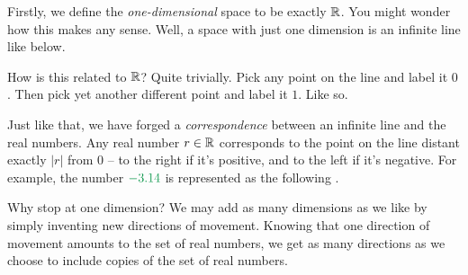 Firstly, we define the \emph{one-dimensional} space to be exactly $\mathbb{R}$. You
might wonder how this makes any sense. Well, a space with just one dimension is
an infinite line like below.
\begin{center}
\end{center}
How is this related to $\mathbb{R}$? Quite trivially. Pick any point on the line and
label it $0$. Then pick yet another different point and label it $1$. Like so.
\begin{center}
\end{center}
Just like that, we have forged a \emph{correspondence} between an infinite line
and the real numbers. Any real number $r \in \mathbb{R}$ corresponds to the point on the
line distant exactly $|r|$ from $0$ -- to the right if it's positive, and to the
left if it's negative. For example, the number $\clg{-3.14}$ is represented as
the following .
\begin{center}
\end{center}

Why stop at one dimension? We may add as many dimensions as we like by simply
inventing new directions of movement. Knowing that one direction of movement
amounts to the set of real numbers, we get as many directions as we choose to
include copies of the set of real numbers.

